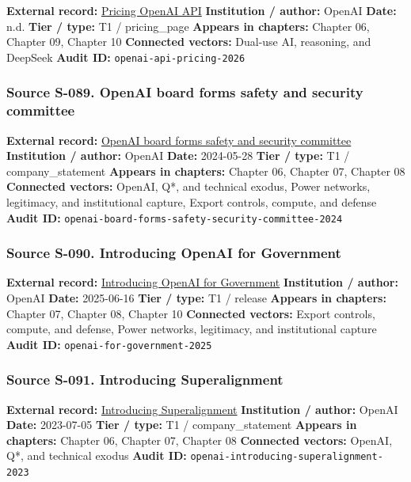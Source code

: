 \documentclass[
  american,
  11pt,
  letterpaper,
]{article}
\begin{document}
\textbf{External record:}
\href{https://developers.openai.com/api/docs/pricing}{Pricing \textbar{}
OpenAI API} \textbf{Institution / author:} OpenAI \textbf{Date:} n.d.
\textbf{Tier / type:} T1 / pricing\_page \textbf{Appears in chapters:}
Chapter 06, Chapter 09, Chapter 10 \textbf{Connected vectors:} Dual-use
AI, reasoning, and DeepSeek \textbf{Audit ID:}
\texttt{openai-api-pricing-2026}

\subsubsection{Source S-089. OpenAI board forms safety and security
committee}\label{source-s-089-openai-board-forms-safety-and-security-committee}

\textbf{External record:}
\href{https://openai.com/index/openai-board-forms-safety-and-security-committee/}{OpenAI
board forms safety and security committee} \textbf{Institution /
author:} OpenAI \textbf{Date:} 2024-05-28 \textbf{Tier / type:} T1 /
company\_statement \textbf{Appears in chapters:} Chapter 06, Chapter 07,
Chapter 08 \textbf{Connected vectors:} OpenAI, Q*, and technical exodus,
Power networks, legitimacy, and institutional capture, Export controls,
compute, and defense \textbf{Audit ID:}
\texttt{openai-board-forms-safety-security-committee-2024}

\subsubsection{Source S-090. Introducing OpenAI for
Government}\label{source-s-090-introducing-openai-for-government}

\textbf{External record:}
\href{https://openai.com/global-affairs/introducing-openai-for-government/}{Introducing
OpenAI for Government} \textbf{Institution / author:} OpenAI
\textbf{Date:} 2025-06-16 \textbf{Tier / type:} T1 / release
\textbf{Appears in chapters:} Chapter 07, Chapter 08, Chapter 10
\textbf{Connected vectors:} Export controls, compute, and defense, Power
networks, legitimacy, and institutional capture \textbf{Audit ID:}
\texttt{openai-for-government-2025}

\subsubsection{Source S-091. Introducing
Superalignment}\label{source-s-091-introducing-superalignment}

\textbf{External record:}
\href{https://openai.com/index/introducing-superalignment/}{Introducing
Superalignment} \textbf{Institution / author:} OpenAI \textbf{Date:}
2023-07-05 \textbf{Tier / type:} T1 / company\_statement \textbf{Appears
in chapters:} Chapter 06, Chapter 07, Chapter 08 \textbf{Connected
vectors:} OpenAI, Q*, and technical exodus \textbf{Audit ID:}
\texttt{openai-introducing-superalignment-2023}
\end{document}
